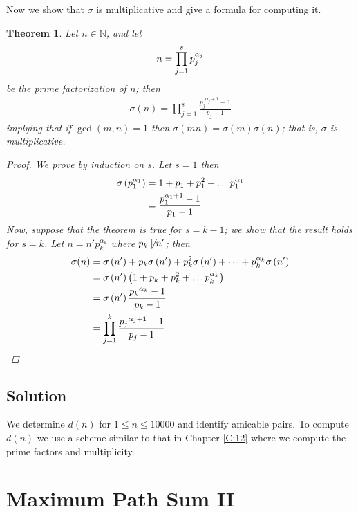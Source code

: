 \documentclass[oneside,12pt]{book}   	%
\newcounter{pr}
\newtheorem{thm}{Theorem}[chapter]
\theoremstyle{definition}
\begin{document}
\begin{spacing}{1.618}
		Now we show that $\sigma$ is multiplicative and give a formula for computing it\cite{Andrews1971}. 
		\begin{thm}
			Let $n\in\mathbb{N}$, and let
			\begin{alignat}{4}
				n=\prod_{j=1}^s p_j^{\alpha_j} \notag
			\end{alignat}
			be the prime factorization of $n$; then
			\begin{alignat}{4}
				\sigma(n)=\prod_{j=1}^s \frac{{p_j}^{\alpha_j+1}-1}{p_j-1}
			\end{alignat}
			implying that if $\gcd{(m, n)}=1$ then $\sigma(mn)=\sigma(m)\sigma(n)$; that is, $\sigma$ is multiplicative. 
			\begin{proof}
				We prove by induction on $s$. Let $s=1$ then 
				\begin{alignat}{4}
					\sigma\left(p_1^{\alpha_1}\right)&=1+p_1+p_1^2+\dots p_1^{\alpha_1} \notag \\
						&=\frac{p_1^{\alpha_1+1}-1}{p_1-1}
				\end{alignat}
				Now, suppose that the theorem is true for $s=k-1$; we show that the result holds for $s=k$. Let $n=n' p_{k}^{\alpha_{k}}$ where $p_{k}\not\mid n'$; then 
				\begin{alignat}{4}
					\sigma(n)&=\sigma\left(n'\right)+p_{k}\sigma\left(n'\right)+p_{k}^2\sigma\left(n'\right)+\dots+p_{k}^{\alpha_{k}}\sigma\left(n'\right) \notag \\
						&=\sigma\left(n'\right)\left(1+p_{k}+p_{k}^2+\dots p_{k}^{\alpha_{k}}\right) \notag \\
						&=\sigma\left(n'\right) \frac{{p_{k}}^{\alpha_k}-1}{p_k-1} \notag \\
						&=\prod_{j=1}^{k} \frac{{p_j}^{\alpha_j+1}-1}{p_j-1} \notag
				\end{alignat}
			\end{proof}
		\end{thm}
		
		\section{Solution}
		
			We determine $d(n)$ for $1\leq n\leq 10000$ and identify amicable pairs. To compute $d(n)$ we use a scheme similar to that in Chapter \ref{C:12} where we compute the prime factors and multiplicity. 
			
			
	\chapter{Maximum Path Sum II}
	

\end{spacing}
\end{document}
